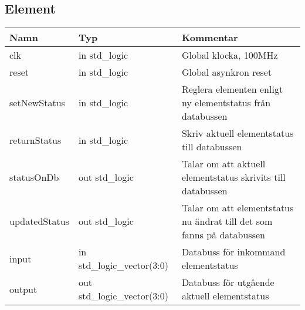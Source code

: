 \subsection{Element}
\begin{table}[H]
	\begin{tabularx}{\textwidth}{l l X}
		\hline
		\textbf{Namn} & \textbf{Typ} & \textbf{Kommentar} \\
		\hline
		clk & in std\_logic & Global klocka, 100MHz \\
		reset & in std\_logic & Global asynkron reset \\
		setNewStatus & in std\_logic & Reglera elementen enligt ny elementstatus från databussen\\
		returnStatus & in std\_logic & Skriv aktuell elementstatus till databussen\\
		statusOnDb & out std\_logic & Talar om att aktuell elementstatus skrivits till databussen\\
		updatedStatus & out std\_logic & Talar om att elementstatus nu ändrat till det som fanns på databussen \\
		input & in std\_logic\_vector(3:0) & Databuss för inkommand elementstatus\\
		output & out std\_logic\_vector(3:0) & Databuss för utgående aktuell elementstatus\\
		\hline
	\end{tabularx}
\end{table}
